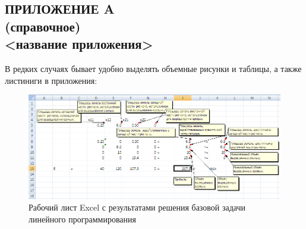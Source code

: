 \renewcommand{\thefigure}{\Asbuk{section}.\arabic{figure}}
\renewcommand{\thetable}{\Asbuk{section}.\arabic{table}}
\renewcommand{\thelstlisting}{\Asbuk{section}.\arabic{lstlisting}}

\begin{landscape}
\section*{ПРИЛОЖЕНИЕ A \\ (справочное) \\ <название приложения>}

\setcounter{section}{1}
\setcounter{figure}{0}
\setcounter{table}{0}
\setcounter{lstlisting}{0}

В редких случаях бывает удобно выделять объемные рисунки и таблицы, а также листиниги в приложения:
  
\begin{figure}[h]
\centering
  \includegraphics[width=1\linewidth]{pic/excel}
  \caption{Рабочий лист Excel с результатами решения базовой задачи линейного программирования}
\end{figure}

\end{landscape}

\newpage
